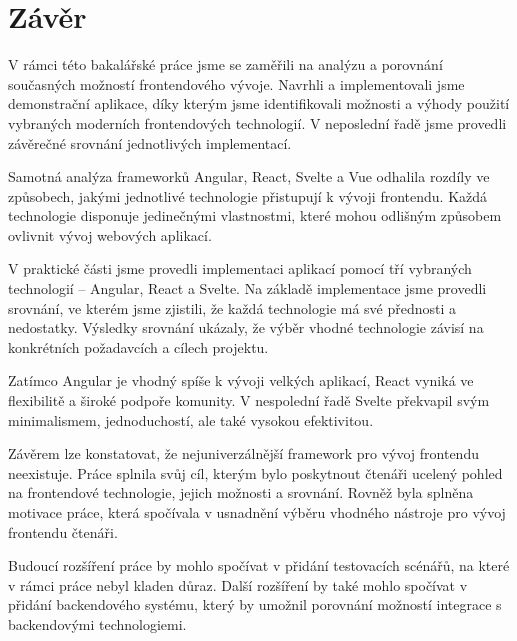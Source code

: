 \section*{Závěr}

V rámci této bakalářské práce jsme se zaměřili na analýzu a porovnání současných možností frontendového vývoje. 
Navrhli a implementovali jsme demonstrační aplikace, díky kterým jsme identifikovali možnosti a výhody použití vybraných moderních frontendových technologií. 
V neposlední řadě jsme provedli závěrečné srovnání jednotlivých implementací.

Samotná analýza frameworků Angular, React, Svelte a Vue odhalila rozdíly ve způsobech, jakými jednotlivé technologie přistupují k vývoji frontendu. 
Každá technologie disponuje jedinečnými vlastnostmi, které mohou odlišným způsobem ovlivnit vývoj webových aplikací. 

V praktické části jsme provedli implementaci aplikací pomocí tří vybraných technologií -- Angular, React a Svelte. 
Na základě implementace jsme provedli srovnání, ve kterém jsme zjistili, že každá technologie má své přednosti a nedostatky. 
Výsledky srovnání ukázaly, že výběr vhodné technologie závisí na konkrétních požadavcích a cílech projektu.

Zatímco Angular je vhodný spíše k vývoji velkých aplikací, React vyniká ve flexibilitě a široké podpoře komunity. 
V nespolední řadě Svelte překvapil svým minimalismem, jednoduchostí, ale také vysokou efektivitou.

Závěrem lze konstatovat, že nejuniverzálnější framework pro vývoj frontendu neexistuje. 
Práce splnila svůj cíl, kterým bylo poskytnout čtenáři ucelený pohled na frontendové technologie, jejich možnosti a srovnání.
Rovněž byla splněna motivace práce, která spočívala v usnadnění výběru vhodného nástroje pro vývoj frontendu čtenáři.

Budoucí rozšíření práce by mohlo spočívat v přidání testovacích scénářů, na které v rámci práce nebyl kladen důraz. 
Další rozšíření by také mohlo spočívat v přidání backendového systému, který by umožnil porovnání možností integrace s backendovými technologiemi.

